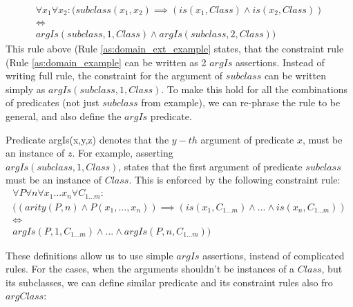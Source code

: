 \begin{equation}\label{as:domain_ext_example}
\begin{gathered}
  \forall x_1 \forall x_2: (subclass(x_1,x_2) \implies (is(x_1,Class) \land is(x_2,Class)) \\ 
  \iff \\
  argIs(subclass,1,Class) \land argIs(subclass,2,Class))
\end{gathered}
\end{equation}
This rule above (Rule \ref{as:domain_ext_example} states, that the constraint
rule (Rule \ref{as:domain_example} can be written as 2 $argIs$ assertions.
Instead of writing full rule, the constraint for the argument of $subclass$ can
be written simply as $argIs(subclass,1,Class)$. To make this hold for all the
combinations of predicates (not just $subclass$ from example), we can
re-phrase the rule to be general, and also define the $argIs$ predicate.

\begin{definition}\label{def:pred_argis}
Predicate argIs(x,y,z) denotes that the $y-th$ argument of predicate $x$, must
be an instance of $z$. For example, asserting \\$argIs(subclass,1, Class)$, states
that the first argument of predicate $subclass$ must be an instance of $Class$.
This is enforced by the following constraint rule:
\begin{equation}\label{as:domain_isa_constraint}
\begin{gathered}
  \forall P \forall n \forall x_1...x_n \forall C_{1...m}: \\
  ((arity(P,n) \land P(x_1,...,x_n)) \implies (is(x_1,C_{1...m}) \land ... \land is(x_n,C_{1...m})) \\ 
  \iff \\
  argIs(P,1,C_{1...m}) \land ... \land argIs(P,n,C_{1...m}))
\end{gathered}
\end{equation}
\end{definition}

These definitions allow us to use simple $argIs$ assertions, instead of
complicated rules. For the cases, when the arguments shouldn't be instances
of a $Class$, but its subclasses, we can define similar predicate and its
constraint rules also fro $argClass$:

